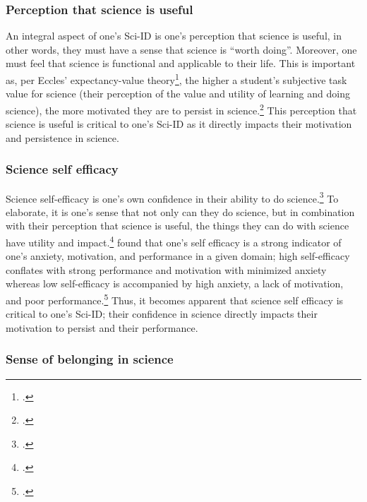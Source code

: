 \documentclass[10pt, twocolumn]{article}
\begin{document}
        \subsubsection{Perception that science is useful}

            An integral aspect of one's Sci-ID is one's perception that science is useful, in other words, they must have a sense that science is ``worth doing''. Moreover, one must feel that science is functional and applicable to their life. This is important as, per Eccles' expectancy-value theory\footcite{wigfield_expectancyvalue_2000}, the higher a student's subjective task value for science (their perception of the value and utility of learning and doing science), the more motivated they are to persist in science.\footcite{brousseau_position_2019} This perception that science is useful is critical to one's Sci-ID as it directly impacts their motivation and persistence in science.

        \subsubsection{Science self efficacy}

            Science self-efficacy is one's own confidence in their ability to do science.\footcite{ballen_enhancing_2017} To elaborate, it is one's sense that not only can they do science, but in combination with their perception that science is useful, the things they can do with science have utility and impact.\footcite{brousseau_position_2019}  \cite{bandura_perceived_1993} found that one's self efficacy is a strong indicator of one's anxiety, motivation, and performance in a given domain; high self-efficacy conflates with strong performance and motivation with minimized anxiety whereas low self-efficacy is accompanied by high anxiety, a lack of motivation, and poor performance.\footcite{bandura_perceived_1993} Thus, it becomes apparent that science self efficacy is critical to one's Sci-ID; their confidence in science directly impacts their motivation to persist and their performance.

        \subsubsection{Sense of belonging in science}
\end{document}
